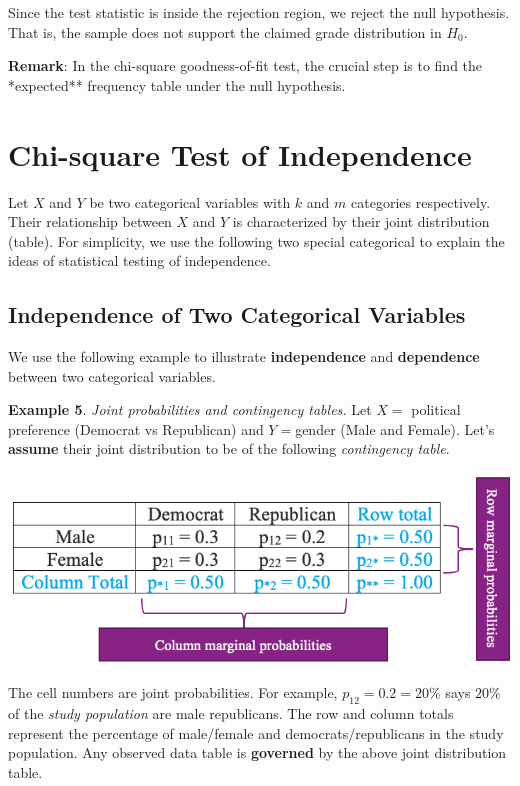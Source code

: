 \documentclass[
]{book}
\begin{document}
Since the test statistic is inside the rejection region, we reject the null hypothesis. That is, the sample does not support the claimed grade distribution in \(H_0\).

\textbf{Remark}: In the chi-square goodness-of-fit test, the crucial step is to find the *expected** frequency table under the null hypothesis.

\hypertarget{chi-square-test-of-independence}{%
\section{Chi-square Test of Independence}\label{chi-square-test-of-independence}}

Let \(X\) and \(Y\) be two categorical variables with \(k\) and \(m\) categories respectively. Their relationship between \(X\) and \(Y\) is characterized by their joint distribution (table). For simplicity, we use the following two special categorical to explain the ideas of statistical testing of independence.

\hypertarget{independence-of-two-categorical-variables}{%
\subsection{Independence of Two Categorical Variables}\label{independence-of-two-categorical-variables}}

We use the following example to illustrate \textbf{independence} and \textbf{dependence} between two categorical variables.

\textbf{Example 5}. \emph{Joint probabilities and contingency tables.} Let \(X =\) political preference (Democrat vs Republican) and \(Y =\)gender (Male and Female). Let's \textbf{assume} their joint distribution to be of the following \emph{contingency table}.

\begin{center}\includegraphics[width=0.65\linewidth]{week13/twoWayContingencyTable} \end{center}

The cell numbers are joint probabilities. For example, \(p_{12} = 0.2 = 20\%\) says \(20\%\) of the \emph{study population} are male republicans. The row and column totals represent the percentage of male/female and democrats/republicans in the study population. Any observed data table is \textbf{governed} by the above joint distribution table.
\end{document}
